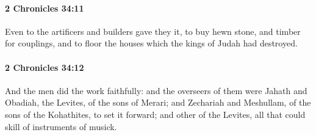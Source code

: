 		\paragraph{2 Chronicles 34:11} %
			\label{2CHRONICLES-34-11}

			Even to the artificers and builders gave they it, to buy hewn stone, and timber for couplings, and to floor the houses which the kings of Judah had destroyed.


		\paragraph{2 Chronicles 34:12} %
			\label{2CHRONICLES-34-12}

			And the men did the work faithfully: and the overseers of them were Jahath and Obadiah, the Levites, of the sons of Merari; and Zechariah and Meshullam, of the sons of the Kohathites, to set it forward; and other of the Levites, all that could skill of instruments of musick.

